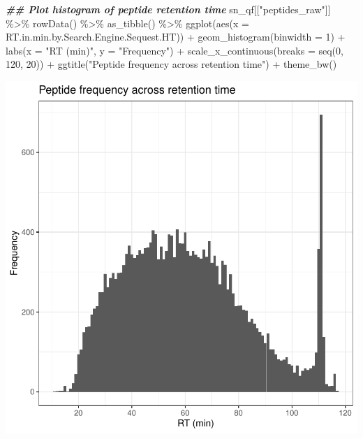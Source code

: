 \documentclass[9pt,a4paper,]{extarticle}
\newenvironment{Shaded}{\begin{snugshade}}{\end{snugshade}}
\newcommand{\AttributeTok}[1]{\textcolor[rgb]{0.77,0.63,0.00}{#1}}
\newcommand{\DecValTok}[1]{\textcolor[rgb]{0.00,0.00,0.81}{#1}}
\newcommand{\DocumentationTok}[1]{\textcolor[rgb]{0.56,0.35,0.01}{\textbf{\textit{#1}}}}
\newcommand{\FunctionTok}[1]{\textcolor[rgb]{0.00,0.00,0.00}{#1}}
\newcommand{\NormalTok}[1]{#1}
\newcommand{\SpecialCharTok}[1]{\textcolor[rgb]{0.00,0.00,0.00}{#1}}
\newcommand{\StringTok}[1]{\textcolor[rgb]{0.31,0.60,0.02}{#1}}
\begin{document}
\begin{Shaded}
\begin{Highlighting}[]
\DocumentationTok{\#\# Plot histogram of peptide retention time}
\NormalTok{sn\_qf[[}\StringTok{"peptides\_raw"}\NormalTok{]] }\SpecialCharTok{\%\textgreater{}\%}
  \FunctionTok{rowData}\NormalTok{() }\SpecialCharTok{\%\textgreater{}\%}
  \FunctionTok{as\_tibble}\NormalTok{() }\SpecialCharTok{\%\textgreater{}\%}
  \FunctionTok{ggplot}\NormalTok{(}\FunctionTok{aes}\NormalTok{(}\AttributeTok{x =}\NormalTok{ RT.in.min.by.Search.Engine.Sequest.HT)) }\SpecialCharTok{+}
  \FunctionTok{geom\_histogram}\NormalTok{(}\AttributeTok{binwidth =} \DecValTok{1}\NormalTok{) }\SpecialCharTok{+}
  \FunctionTok{labs}\NormalTok{(}\AttributeTok{x =} \StringTok{"RT (min)"}\NormalTok{, }\AttributeTok{y =} \StringTok{"Frequency"}\NormalTok{) }\SpecialCharTok{+}
  \FunctionTok{scale\_x\_continuous}\NormalTok{(}\AttributeTok{breaks =} \FunctionTok{seq}\NormalTok{(}\DecValTok{0}\NormalTok{, }\DecValTok{120}\NormalTok{, }\DecValTok{20}\NormalTok{)) }\SpecialCharTok{+}
  \FunctionTok{ggtitle}\NormalTok{(}\StringTok{"Peptide frequency across retention time"}\NormalTok{) }\SpecialCharTok{+}
  \FunctionTok{theme\_bw}\NormalTok{()}
\end{Highlighting}
\end{Shaded}

\begin{center}\includegraphics[height=0.3\textheight]{workflow_expressions_files/figure-latex/lfq_RT-1} \end{center}
\end{document}
